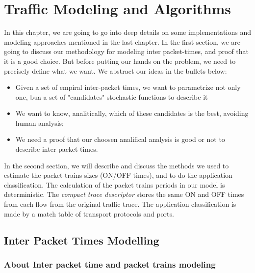 \chapter{Traffic Modeling and Algorithms}\label{ch:modeling-evaluation}


In this chapter, we are going to go into deep details on some implementations and modeling approaches mentioned in the last chapter. In the first section, we are going to discuss our methodology for modeling inter packet-times, and proof that it is a good choice. But before putting our hands on the problem, we need to precisely define what we want. We abstract our ideas in the bullets below:

\begin{itemize}    
    \item Given a set of empiral inter-packet times, we want to parametrize not only one, bua a set of "candidates" stochastic functions to describe it
    \item We want to know, analitically,  which of these candidates is the best, avoiding human analysis;
    \item We need a proof that our choosen analifical analysis is good or not to describe inter-packet times.
\end{itemize}

In the second section, we will describe and discuss the methods we used to estimate the packet-trains sizes (ON/OFF times), and to do the application classification. The calculation of the packet trains periods in our model is deterministic. The \textit{compact trace descriptor} stores the same ON and OFF times from each flow from the original traffic trace. The application classification is made by a match table of transport protocols and ports. 

\section{Inter Packet Times Modelling}

\subsection{About Inter packet time and packet trains modeling}

